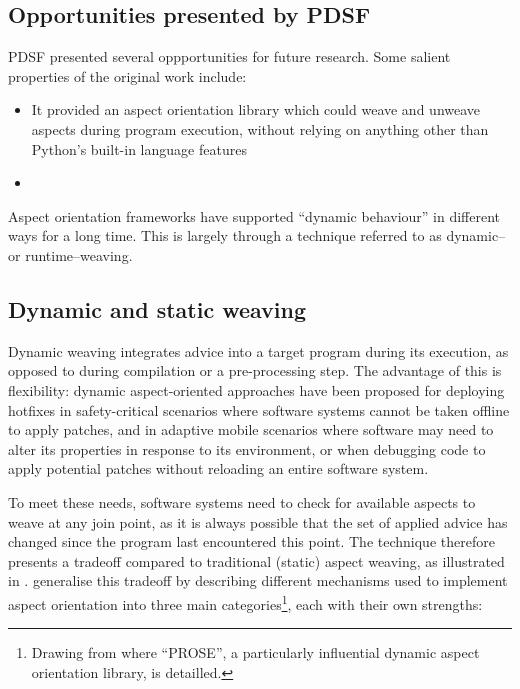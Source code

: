 \subsection{Opportunities presented by PDSF}

PDSF presented several oppportunities for future research. Some salient
properties of the original work include:

\begin{itemize}
    \item It provided an aspect orientation library which could weave and
    unweave aspects during program execution, without relying on anything other
    than Python's built-in language features
    \item {}
\end{itemize}






Aspect orientation frameworks have supported ``dynamic behaviour'' in different
ways for a long time. This is largely through a technique referred to as dynamic–
or runtime–weaving.

\subsection{Dynamic and static weaving}

Dynamic weaving integrates advice into a target program during its execution, as
opposed to during compilation or a pre-processing step. The advantage of this is
flexibility: dynamic aspect-oriented approaches have been proposed for deploying
hotfixes in safety-critical scenarios where software systems cannot be taken
offline to apply patches, and in adaptive mobile scenarios where software
may need to alter its properties in response to its
environment\cite{hveding2005aspect}, or when debugging code to apply potential
patches without reloading an entire software system\cite{popovici2002PROSE}.

To meet these needs, software systems need to check for available aspects to
weave at any join point, as it is always possible that the set of applied advice
has changed since the program last encountered this point. The technique
therefore presents a tradeoff compared to traditional (static) aspect weaving,
as illustrated in \cite{dynamicAOchitchyan}. \citeauthor{dynamicAOchitchyan}
generalise this tradeoff by describing different mechanisms used to implement
aspect orientation into three main categories\footnote{Drawing from
\cite{popovici2002PROSE,popovici2003JITaspects} where ``PROSE'', a particularly
influential dynamic aspect orientation library, is detailled.}, each with their own
strengths:

